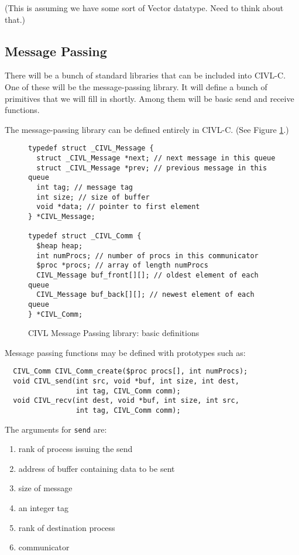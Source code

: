 \documentclass[11pt]{article}
\begin{document}
(This is assuming we have some sort of Vector datatype.  Need to think
about that.)

\subsection{Message Passing}

There will be a bunch of standard libraries that can be included
into CIVL-C.  One of these will be the message-passing library.
It will define a bunch of primitives that we will fill in shortly.
Among them will be basic send and receive functions.

The message-passing library can be defined entirely in CIVL-C.
(See Figure \ref{fig:mp1}.)

\begin{figure}
\begin{verbatim}
typedef struct _CIVL_Message {
  struct _CIVL_Message *next; // next message in this queue
  struct _CIVL_Message *prev; // previous message in this queue
  int tag; // message tag
  int size; // size of buffer
  void *data; // pointer to first element
} *CIVL_Message;

typedef struct _CIVL_Comm {
  $heap heap;
  int numProcs; // number of procs in this communicator
  $proc *procs; // array of length numProcs
  CIVL_Message buf_front[][]; // oldest element of each queue
  CIVL_Message buf_back[][]; // newest element of each queue
} *CIVL_Comm;
\end{verbatim}
  \caption{CIVL Message Passing library: basic definitions}
  \label{fig:mp1}
\end{figure}

Message passing functions may be defined with prototypes such as:
\begin{verbatim}
  CIVL_Comm CIVL_Comm_create($proc procs[], int numProcs);
  void CIVL_send(int src, void *buf, int size, int dest,
                 int tag, CIVL_Comm comm);
  void CIVL_recv(int dest, void *buf, int size, int src,
                 int tag, CIVL_Comm comm);
\end{verbatim}

The arguments for \texttt{send} are:
\begin{enumerate}
\item rank of process issuing the send
\item address of buffer containing data to be sent
\item size of message
\item an integer tag
\item rank of destination process
\item communicator
\end{enumerate}
\end{document}
